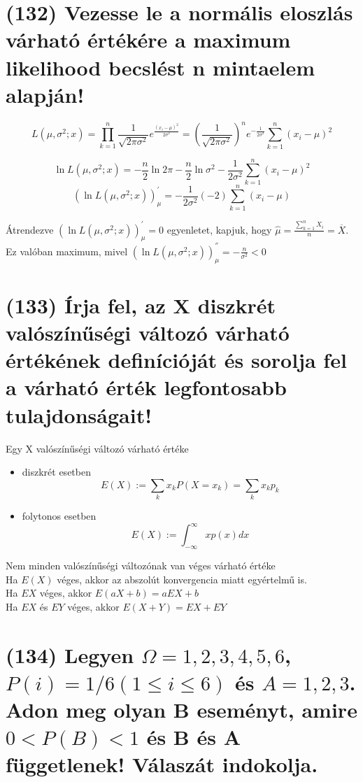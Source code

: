 \documentclass[12p]{article}
\begin{document}
\section{(132) Vezesse le a normális eloszlás várható értékére a maximum likelihood becslést n mintaelem alapján!}

$$L(\mu, \sigma^2;x) 
= \prod^n_{k=1} \frac{1}{\sqrt{2\pi \sigma^2}} 
e^{\frac{(x_i-\mu)^2}{2\sigma^2}}
=\left(\frac{1}{\sqrt{2\pi \sigma^2}}\right)^n 
e^{-\frac{1}{2 \sigma^2}} \sum^n_{k=1} (x_i - \mu )^2$$

$$\ln L(\mu, \sigma^2;x) = - \frac{n}{2} \ln 2\pi - \frac{n}{2} \ln \sigma^2 - \frac{1}{2\sigma^2} \sum^n_{k=1} (x_i - \mu)^2$$
$$(\ln L(\mu,\sigma^2;x))^{'}_{\mu} = - \frac{1}{2\sigma^2}(-2)\sum^n_{k=1}(x_i - \mu)$$

Átrendezve $(\ln L(\mu,\sigma^2;x))^{'}_{\mu} = 0$ egyenletet, kapjuk, hogy $\displaystyle{\hat{\mu} = \frac{\sum^n_{k=1} X_i}{n} = \overline{X}}$. Ez valóban maximum, mivel $(\ln L(\mu,\sigma^2;x))^{''}_{\mu} = -\frac{n}{\sigma^2} < 0$

\section{(133) Írja fel, az X diszkrét valószínűségi változó várható értékének definícióját és sorolja fel
a várható érték legfontosabb tulajdonságait!}

Egy X valószínűségi változó várható értéke

\begin{itemize}
	\item diszkrét esetben
		$$E(X) := \sum_k x_k P(X = x_k) = \sum_k x_k p_k$$
		
	\item folytonos esetben
		$$E(X) := \int_{-\infty}^\infty xp(x)dx$$
\end{itemize}

Nem minden valószínűségi változónak van véges várható értéke\\
Ha $E(X)$ véges, akkor az abszolút konvergencia miatt egyértelmű is.\\
Ha $EX$ véges, akkor $E(aX+b)=aEX+b$\\
Ha $EX$ és $EY$ véges, akkor $E(X+Y)=EX+EY$

\section{(134) Legyen $\Omega = {1, 2, 3, 4, 5, 6}$, $P(i) = 1/6 (1 \leq i \leq 6)$ és $A = {1, 2, 3}$. Adon meg olyan B
eseményt, amire $0 < P(B) < 1$ és B és A függetlenek! Válaszát indokolja.}
\end{document}
